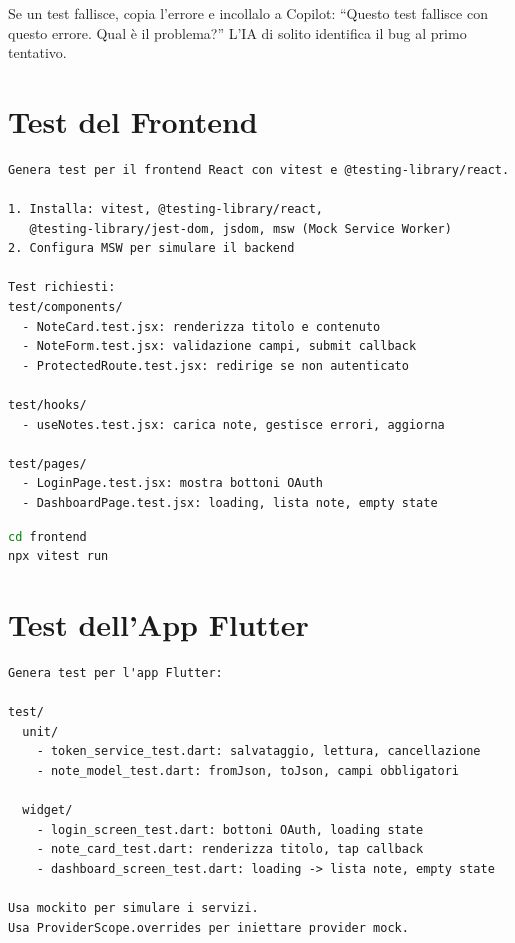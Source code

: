 \begin{tipbox}
Se un test fallisce, copia l'errore e incollalo a Copilot: ``Questo test fallisce con questo errore. Qual è il problema?'' L'IA di solito identifica il bug al primo tentativo.
\end{tipbox}

\section{Test del Frontend}

\begin{praticabox}[title={Pratica --- Genera i test React}]
\begin{lstlisting}[language={}]
Genera test per il frontend React con vitest e @testing-library/react.

1. Installa: vitest, @testing-library/react,
   @testing-library/jest-dom, jsdom, msw (Mock Service Worker)
2. Configura MSW per simulare il backend

Test richiesti:
test/components/
  - NoteCard.test.jsx: renderizza titolo e contenuto
  - NoteForm.test.jsx: validazione campi, submit callback
  - ProtectedRoute.test.jsx: redirige se non autenticato

test/hooks/
  - useNotes.test.jsx: carica note, gestisce errori, aggiorna

test/pages/
  - LoginPage.test.jsx: mostra bottoni OAuth
  - DashboardPage.test.jsx: loading, lista note, empty state
\end{lstlisting}
\end{praticabox}

\begin{lstlisting}[language=bash]
cd frontend
npx vitest run
\end{lstlisting}

\section{Test dell'App Flutter}

\begin{praticabox}[title={Pratica --- Genera i test Flutter}]
\begin{lstlisting}[language={}]
Genera test per l'app Flutter:

test/
  unit/
    - token_service_test.dart: salvataggio, lettura, cancellazione
    - note_model_test.dart: fromJson, toJson, campi obbligatori

  widget/
    - login_screen_test.dart: bottoni OAuth, loading state
    - note_card_test.dart: renderizza titolo, tap callback
    - dashboard_screen_test.dart: loading -> lista note, empty state

Usa mockito per simulare i servizi.
Usa ProviderScope.overrides per iniettare provider mock.
\end{lstlisting}
\end{praticabox}

